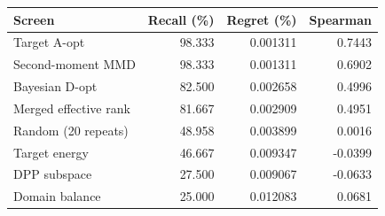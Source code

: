 \begin{tabular}{lrrr}
\toprule
Screen & Recall (\%) & Regret (\%) & Spearman\\
\midrule
Target A-opt & 98.333 & 0.001311 & 0.7443 \\
Second-moment MMD & 98.333 & 0.001311 & 0.6902 \\
Bayesian D-opt & 82.500 & 0.002658 & 0.4996 \\
Merged effective rank & 81.667 & 0.002909 & 0.4951 \\
Random (20 repeats) & 48.958 & 0.003899 & 0.0016 \\
Target energy & 46.667 & 0.009347 & -0.0399 \\
DPP subspace & 27.500 & 0.009067 & -0.0633 \\
Domain balance & 25.000 & 0.012083 & 0.0681 \\
\bottomrule
\end{tabular}
